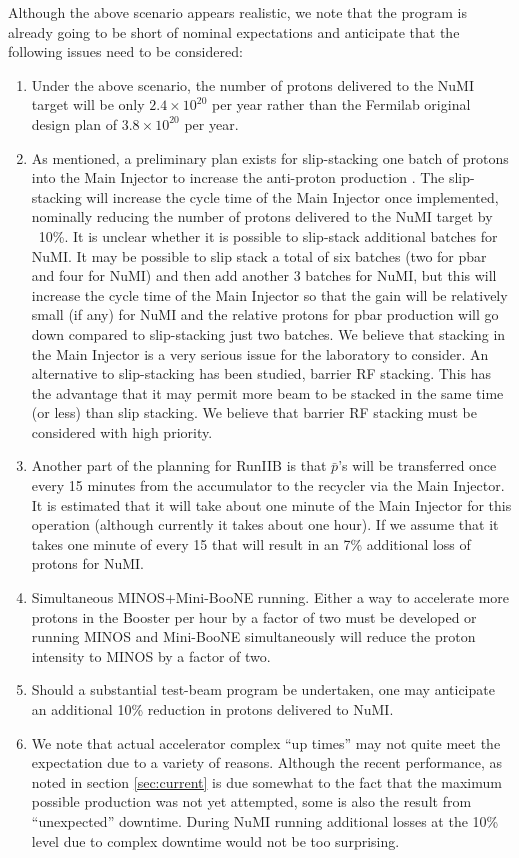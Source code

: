 \documentclass{article}
\begin{document}
Although the above scenario appears realistic, we note that the program is
already going to be short of nominal expectations and anticipate that the 
following issues need to be considered:
\begin {enumerate}
\item Under the above scenario, the number of protons delivered to the NuMI
target will be only $2.4 \times 10^{20}$ per year rather than the Fermilab
original design plan of $3.8 \times 10^{20}$ per year.
\item As mentioned, a preliminary plan exists for slip-stacking one batch of 
protons into
the Main Injector to increase the anti-proton production \cite {RunIIB}. 
The slip-stacking
will increase the cycle time of the Main Injector once implemented, 
nominally reducing the number of protons delivered to the NuMI target 
by ~10\%. It is unclear whether it is possible to slip-stack additional
batches for NuMI. It may be possible to slip stack a total of six batches
(two for pbar and four for NuMI) and then add another 3 batches for NuMI,
but this will increase the cycle time of the Main Injector so that the
gain will be relatively small (if any) for NuMI and the relative protons
for pbar production will go down compared to slip-stacking just two batches.
We believe that stacking in the Main Injector is a very serious issue for
the laboratory to consider. An alternative to slip-stacking has been 
studied, barrier RF stacking. This has the advantage that it may permit more
beam to be stacked in the same time (or less) than slip stacking.
We believe that barrier RF stacking must be
considered with high priority.
\item Another part of the planning for RunIIB is that $\bar p$'s will be
transferred once every 15 minutes from the accumulator to the recycler via
the Main Injector. It is estimated that it will take about one minute of
the Main Injector for this operation (although currently it takes about
one hour). If we assume that it takes one minute of every 15 that will result
in an 7\% additional loss of protons for NuMI.
\item Simultaneous MINOS+Mini-BooNE running. Either a way to accelerate more
protons in the Booster per hour 
by a factor of two must be developed or running MINOS
and Mini-BooNE simultaneously will reduce the proton intensity to MINOS
by a factor of two. 
\item Should a substantial test-beam program be undertaken, one may anticipate
an additional 10\% reduction in protons delivered to NuMI.
\item We note that actual accelerator complex ``up times'' may not quite 
meet the expectation due to a variety of reasons. Although
the recent performance, as noted in section \ref {sec:current} is due
somewhat to the fact that the maximum possible production was not
yet attempted, some is also the result from ``unexpected'' downtime.
During NuMI running additional losses
at the 10\% level due to complex downtime would not be too surprising. 
\end {enumerate}
\end{document}
